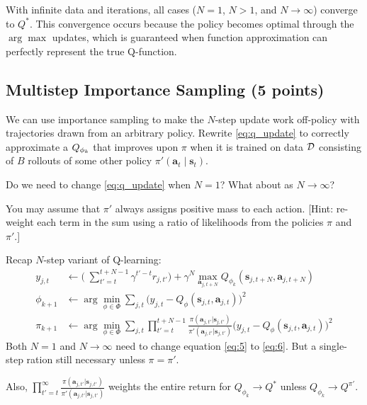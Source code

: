 \documentclass{article}
\begin{document}
\begin{tcolorbox}[answerbox, parskip=false]
  With infinite data and iterations, all cases ($N = 1$, $N > 1$, and $N \to \infty$) converge to $Q^*$.
  This convergence occurs because the policy becomes optimal through the $\arg\max$ updates, which is guaranteed when function approximation can perfectly represent the true Q-function.
\end{tcolorbox}

\subsection{Multistep Importance Sampling (5 points)}
\label{q:importance_sampling}

We can use importance sampling to make the $N$-step update work off-policy with trajectories drawn from an arbitrary policy. Rewrite \eqref{eq:q_update} to correctly approximate a $Q_{\phi_k}$ that improves upon $\pi$ when it is trained on data $\mathcal{D}$ consisting of $B$ rollouts of some other policy $\pi'(\mathbf a_t\mid\mathbf s_t)$. 

Do we need to change \eqref{eq:q_update} when $N=1$? What about as $N\to\infty$? 

You may assume that $\pi'$ always assigns positive mass to each action. [Hint: re-weight each term in the sum using a ratio of likelihoods from the policies $\pi$ and $\pi'$.]

 
\begin{tcolorbox}[answerbox, parskip=false]
  Recap $N$-step variant of Q-learning:
  \begin{align}
    y_{j,t} &\gets \biggl(\;\sum_{t'=t}^{t+N-1} \gamma^{t'-t} r_{j,t'}\biggr)+\gamma^{N} \max _{\mathbf{a}_{j,t+N}} Q_{\phi_k}\left(\mathbf{s}_{j,t+N}, \mathbf{a}_{j,t+N}\right)\\
    \phi_{k+1} &\gets \arg\min_{\phi\in\Phi}  \sum_{j,t} \bigl( y_{j,t}-Q_{\phi}(\mathbf s_{j,t},\mathbf a_{j,t}) \bigr)^2 \label{eq:5}\\ 
    \pi_{k+1} &\gets \arg\min_{\phi\in\Phi}  \sum_{j,t} \prod^{t+N-1}_{t'=t} \frac{\pi(\mathbf{a}_{j,t'}|\mathbf{s}_{j,t'})}{\pi'(\mathbf{a}_{j,t'}|\mathbf{s}_{j,t'})} \bigl( y_{j,t}-Q_{\phi}(\mathbf s_{j,t},\mathbf a_{j,t}) \bigr)^2 \label{eq:6}
  \end{align}
  Both $N=1$ and $N\to\infty$ need to change equation \eqref{eq:5} to \eqref{eq:6}. But a single-step ration still necessary unless $\pi=\pi'$. 
  
  Also, $\prod^\infty_{t'=t} \frac{\pi(\mathbf{a}_{j,t'}|\mathbf{s}_{j,t'})}{\pi'(\mathbf{a}_{j,t'}|\mathbf{s}_{j,t'})}$ weights the entire return for $Q_{\phi_k} \rightarrow Q^*$ unless $Q_{\phi_k} \rightarrow Q^{\pi'}$.
\end{tcolorbox}
\end{document}
